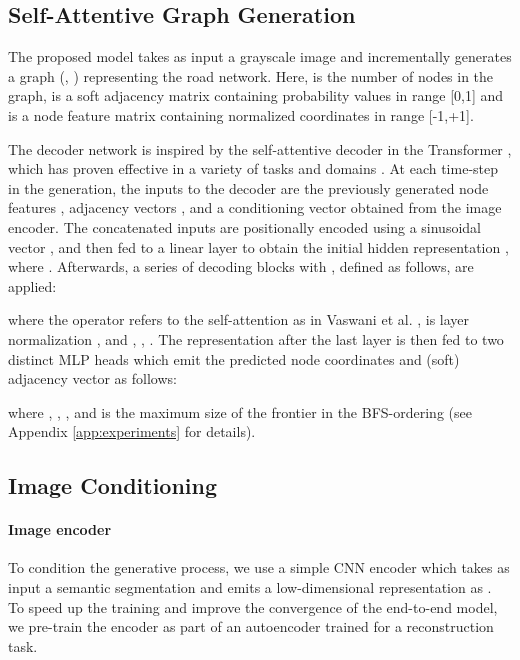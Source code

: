 \documentclass{article}
\begin{document}
\subsection{Self-Attentive Graph Generation}

The proposed model takes as input a grayscale image  and incrementally generates a graph \big(, \big) representing the road network. Here,  is the number of nodes in the graph,  is a soft adjacency matrix containing probability values in range [0,1] and  is a node feature matrix containing normalized coordinates in range [-1,+1]. 

The decoder network is inspired by the self-attentive decoder in the Transformer \citep{vaswani2017attention}, which has proven effective in a variety of tasks and domains \citep{radford2019language,liu2019roberta,chiu2018state,parmar2018image,chen2019path,kaiser2017one}.
At each time-step  in the generation, the inputs to the decoder are the previously generated node features , adjacency vectors , and a conditioning vector  obtained from the image encoder. The concatenated inputs are positionally encoded using a sinusoidal vector  \citep{vaswani2017attention}, and then fed to a linear layer to obtain the initial hidden representation , where . Afterwards, a series of  decoding blocks with , defined as follows, are applied:

where the  operator refers to the self-attention as in Vaswani et al. \citep{vaswani2017attention},  is layer normalization \citep{ba2016layer}, and , , .
The representation after the last layer is then fed to two distinct MLP heads which emit the predicted node coordinates and (soft) adjacency vector as follows:

where , , , and  is the maximum size of the frontier in the BFS-ordering (see Appendix \ref{app:experiments} for details).




\subsection{Image Conditioning}
\paragraph{Image encoder} To condition the generative process, we use a simple CNN encoder which takes as input a semantic segmentation  and emits a low-dimensional representation as . To speed up the training and improve the convergence of the end-to-end model, we pre-train the encoder as part of an autoencoder trained for a reconstruction task. 
\end{document}
